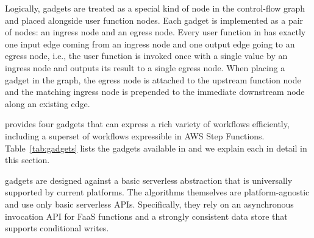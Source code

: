 Logically, gadgets are treated as a special kind of node in the control-flow
graph and placed alongside user function nodes. Each gadget is implemented as
a pair of nodes: an ingress node and an egress node. Every user function in
\name{} has exactly one input edge coming from an ingress node and one output
edge going to an egress node, i.e., the user function is invoked once with a
single value by an ingress node and outputs its result to a single egress
node. When placing a gadget in the graph, the egress node is attached to the
upstream function node and the matching ingress node is prepended to the
immediate downstream node along an existing edge.

\name{} provides four gadgets that can express a rich variety of workflows
efficiently, including a superset of workflows expressible in AWS Step
Functions. Table~\ref{tab:gadgets} lists the gadgets available in \name{} and
we explain each in detail in this section.

\name{} gadgets are designed against a basic serverless abstraction that is
universally supported by current platforms. The algorithms themselves are
platform-agnostic and use only basic serverless APIs. Specifically, they rely
on an asynchronous invocation API for FaaS functions and a strongly consistent
data store that supports conditional writes.






